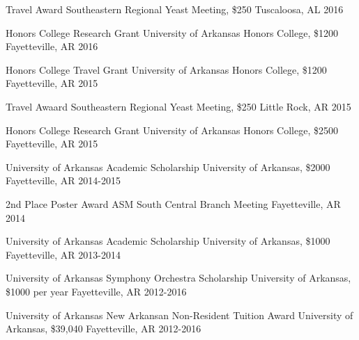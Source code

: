 \begin{cvhonors}
  \cvhonor
    {Travel Award} %
    {Southeastern Regional Yeast Meeting, \$250} %
    {Tuscaloosa, AL} %
    {2016} %

  \cvhonor
    {Honors College Research Grant} %
    {University of Arkansas Honors College, \$1200} %
    {Fayetteville, AR} %
    {2016} %

  \cvhonor
    {Honors College Travel Grant} %
    {University of Arkansas Honors College, \$1200} %
    {Fayetteville, AR} %
    {2015} %

  \cvhonor
    {Travel Awaard} %
    {Southeastern Regional Yeast Meeting, \$250} %
    {Little Rock, AR} %
    {2015} %

  \cvhonor
    {Honors College Research Grant} %
    {University of Arkansas Honors College, \$2500} %
    {Fayetteville, AR} %
    {2015} %

   \cvhonor
    {University of Arkansas Academic Scholarship} %
    {University of Arkansas, \$2000} %
    {Fayetteville, AR} %
    {2014-2015} %

  \cvhonor
    {2nd Place Poster Award} %
    {ASM South Central Branch Meeting} %
    {Fayetteville, AR} %
    {2014} %

    \cvhonor
    {University of Arkansas Academic Scholarship} %
    {University of Arkansas, \$1000} %
    {Fayetteville, AR} %
    {2013-2014} %

   \cvhonor
    {University of Arkansas Symphony Orchestra Scholarship} %
    {University of Arkansas, \$1000 per year} %
    {Fayetteville, AR} %
    {2012-2016} %

  \cvhonor
    {University of Arkansas New Arkansan Non-Resident Tuition Award} %
    {University of Arkansas, \$39,040} %
    {Fayetteville, AR} %
    {2012-2016} %

\end{cvhonors}



